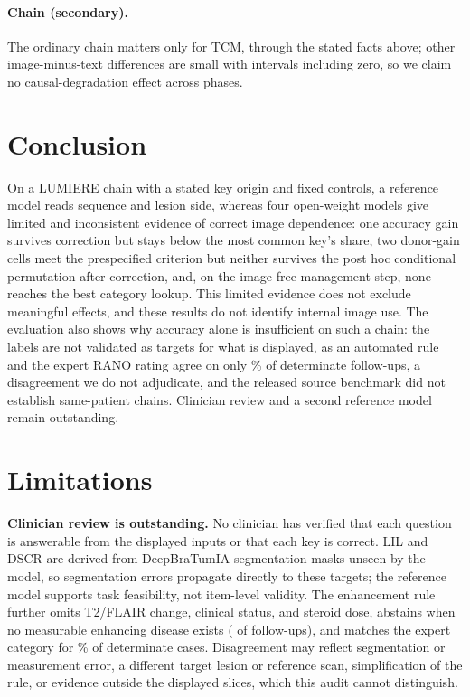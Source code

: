 \documentclass[conference]{IEEEtran}
\begin{document}
\paragraph{Chain (secondary).} The ordinary chain matters only for TCM, through the stated facts above; other image-minus-text differences are small with intervals including zero, so we claim no causal-degradation effect across phases.











\section{Conclusion}
\label{sec:conclusion}

On a LUMIERE chain with a stated key origin and fixed controls, a reference model reads sequence and lesion side, whereas four open-weight models give limited and inconsistent evidence of correct image dependence: one accuracy gain survives correction but stays below the most common key's share, two donor-gain cells meet the prespecified criterion but neither survives the post hoc conditional permutation after correction, and, on the image-free management step, none reaches the best category lookup. This limited evidence does not exclude meaningful effects, and these results do not identify internal image use. The evaluation also shows why accuracy alone is insufficient on such a chain: the labels are not validated as targets for what is displayed, as an automated rule and the expert RANO rating agree on only \vfourConcordantDetPct{}\% of determinate follow-ups, a disagreement we do not adjudicate, and the released source benchmark did not establish same-patient chains. Clinician review and a second reference model remain outstanding.



\section*{Limitations}
\label{sec:limitations}

\textbf{Clinician review is outstanding.} No clinician has verified that each question is answerable from the displayed inputs or that each key is correct. LIL and DSCR are derived from DeepBraTumIA segmentation masks unseen by the model, so segmentation errors propagate directly to these targets; the reference model supports task feasibility, not item-level validity. The enhancement rule further omits T2/FLAIR change, clinical status, and steroid dose, abstains when no measurable enhancing disease exists (\vfourUndetermined{} of \vfourFollowups{} follow-ups), and matches the expert category for \vfourConcordantDetPct{}\% of determinate cases. Disagreement may reflect segmentation or measurement error, a different target lesion or reference scan, simplification of the rule, or evidence outside the displayed slices, which this audit cannot distinguish.
\end{document}
